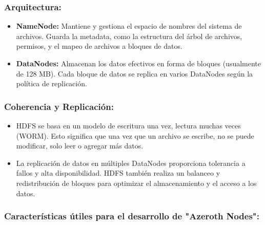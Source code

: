 \subsubsection{Arquitectura:}

\begin{itemize}
    \item \textbf{NameNode:} Mantiene y gestiona el espacio de nombres del sistema de archivos. Guarda la metadata, como la estructura del árbol de archivos, permisos, y el mapeo de archivos a bloques de datos.
    \item \textbf{DataNodes:} Almacenan los datos efectivos en forma de bloques (usualmente de 128 MB). Cada bloque de datos se replica en varios DataNodes según la política de replicación.
\end{itemize}

\subsubsection{Coherencia y Replicación:}

\begin{itemize}
    \item HDFS se basa en un modelo de escritura una vez, lectura muchas veces (WORM). Esto significa que una vez que un archivo se escribe, no se puede modificar, solo leer o agregar más datos.
    \item La replicación de datos en múltiples DataNodes proporciona tolerancia a fallos y alta disponibilidad. HDFS también realiza un balanceo y redistribución de bloques para optimizar el almacenamiento y el acceso a los datos.
\end{itemize}

\subsubsection{Características útiles para el desarrollo de "Azeroth Nodes":}

